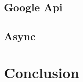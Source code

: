 \documentclass[a4paper]{article}
\newcommand{\rpi}{\emph{Raspbery Pi}}
\begin{document}
\subsection{Google Api}
\subsection{Async}

\section{Conclusion}

\pagebreak



\listoffigures
\end{document}
